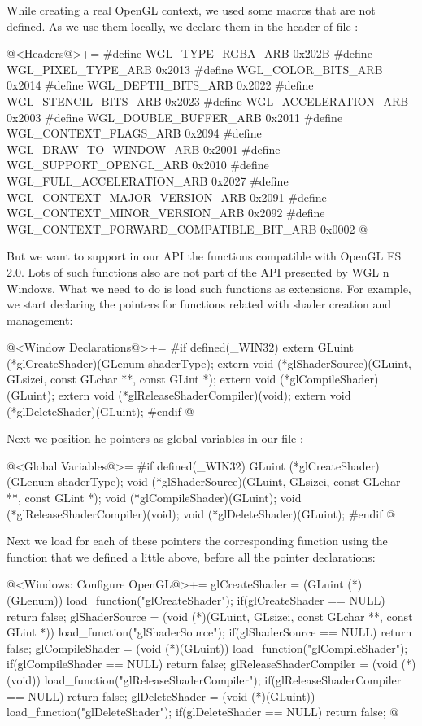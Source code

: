 While creating a real OpenGL context, we used some macros that are not
defined. As we use them locally, we declare them in the header of file
:

\iniciocodigo
@<Headers@>+=
#define WGL_TYPE_RGBA_ARB                      0x202B
#define WGL_PIXEL_TYPE_ARB                     0x2013
#define WGL_COLOR_BITS_ARB                     0x2014
#define WGL_DEPTH_BITS_ARB                     0x2022
#define WGL_STENCIL_BITS_ARB                   0x2023
#define WGL_ACCELERATION_ARB                   0x2003
#define WGL_DOUBLE_BUFFER_ARB                  0x2011
#define WGL_CONTEXT_FLAGS_ARB                  0x2094
#define WGL_DRAW_TO_WINDOW_ARB                 0x2001
#define WGL_SUPPORT_OPENGL_ARB                 0x2010
#define WGL_FULL_ACCELERATION_ARB              0x2027
#define WGL_CONTEXT_MAJOR_VERSION_ARB          0x2091
#define WGL_CONTEXT_MINOR_VERSION_ARB          0x2092
#define WGL_CONTEXT_FORWARD_COMPATIBLE_BIT_ARB 0x0002
@
\fimcodigo

But we want to support in our API the functions compatible with OpenGL
ES 2.0. Lots of such functions also are not part of the API presented
by WGL n Windows. What we need to do is load such functions as
extensions. For example, we start declaring the pointers for functions
related with shader creation and management:

\iniciocodigo
@<Window Declarations@>+=
#if defined(_WIN32)
extern GLuint (*glCreateShader)(GLenum shaderType);
extern void (*glShaderSource)(GLuint, GLsizei, const GLchar **, const GLint *);
extern void (*glCompileShader)(GLuint);
extern void (*glReleaseShaderCompiler)(void);
extern void (*glDeleteShader)(GLuint);
#endif
@
\fimcodigo

Next we position he pointers as global variables in our
file :

\iniciocodigo
@<Global Variables@>=
#if defined(_WIN32)
GLuint (*glCreateShader)(GLenum shaderType);
void (*glShaderSource)(GLuint, GLsizei, const GLchar **, const GLint *);
void (*glCompileShader)(GLuint);
void (*glReleaseShaderCompiler)(void);
void (*glDeleteShader)(GLuint);
#endif
@
\fimcodigo

Next we load for each of these pointers the corresponding function
using the function that we defined a little above, before all the
pointer declarations:

\iniciocodigo
@<Windows: Configure OpenGL@>+=
glCreateShader = (GLuint (*)(GLenum)) load_function("glCreateShader");
if(glCreateShader == NULL)
  return false;
glShaderSource = (void (*)(GLuint, GLsizei, const GLchar **, const GLint *))
                    load_function("glShaderSource");
if(glShaderSource == NULL)
  return false;
glCompileShader = (void (*)(GLuint)) load_function("glCompileShader");
if(glCompileShader == NULL)
  return false;
glReleaseShaderCompiler = (void (*)(void))
                             load_function("glReleaseShaderCompiler");
if(glReleaseShaderCompiler == NULL)
  return false;
glDeleteShader = (void (*)(GLuint)) load_function("glDeleteShader");
if(glDeleteShader == NULL)
  return false;
@
\fimcodigo

